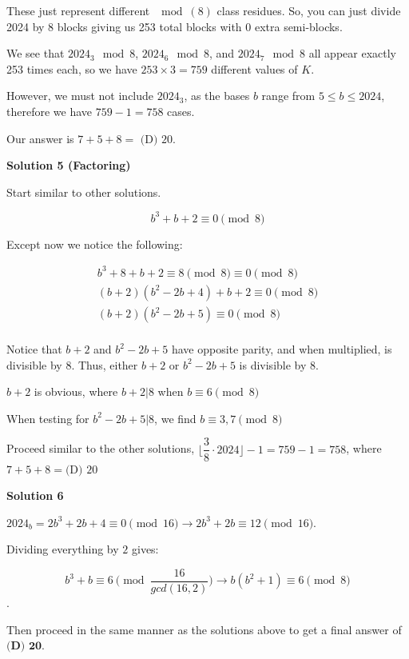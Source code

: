 \begin{enumerate}
 These just represent different \( \mod(8) \) class residues. So, you can just divide 2024 by 8 blocks giving us 253 total blocks with 0 extra semi-blocks.

 We see that \( 2024_3 \mod 8 \), \( 2024_6 \mod 8 \), and \( 2024_7 \mod 8 \) all appear exactly 253 times each, so we have \( 253 \times 3 = 759 \) different values of \( K \).

 However, we must not include \( 2024_3 \), as the bases \( b \) range from \( 5 \le b \le 2024 \), therefore we have \( 759-1=758 \) cases.

 Our answer is \( 7+5+8= \) $\boxed{\text{(D) }20}$.

 



\textbf{Solution 5 (Factoring)}

Start similar to other solutions.

 
 \[b^3+b+2 \equiv 0\pmod 8\]

 Except now we notice the following:

 \begin{align*}b^3+8+b+2 \equiv 8\pmod 8 \equiv 0\pmod 8\\(b+2)(b^2-2b+4) + b+2 \equiv 0\pmod 8\\(b+2)(b^2-2b+5) \equiv 0\pmod 8\\\end{align*}


 Notice that $b+2$ and $b^2-2b+5$ have opposite parity, and when multiplied, is divisible by $8$. Thus, either $b+2$ or $b^2-2b+5$ is divisible by $8$.

 $b+2$ is obvious, where $b+2 | 8$ when $b \equiv 6\pmod 8$

 When testing for $b^2-2b+5 | 8$, we find $b \equiv 3, 7\pmod 8$

 Proceed similar to the other solutions, $\lfloor\dfrac{3}{8} \cdot 2024\rfloor-1=759-1=758$, where $7+5+8=\boxed{\text{(D) }20}$




\textbf{Solution 6}

$2024_b =2b^3 +2b+4 \equiv 0 \pmod {16} \to 2b^3 +2b \equiv 12 \pmod {16}$. 

 Dividing everything by $2$ gives: 

 
 \[b^3+b \equiv 6 \pmod {\frac{16}{gcd(16,2)}} \to b(b^2 +1)\equiv 6 \pmod {8}\].

 Then proceed in the same manner as the solutions above to get a final answer of $\boxed{\textbf{(D) 20}}$. 


\end{enumerate}
